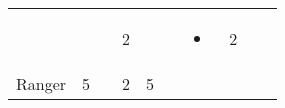 \documentclass[12pt]{article}
\begin{document}
\begin{longtable}[]{@{}llllllllll@{}}
\begin{minipage}[t]{0.06\columnwidth}\raggedright\strut
\strut\end{minipage} &
\begin{minipage}[t]{0.06\columnwidth}\raggedright\strut
\strut\end{minipage} &
\begin{minipage}[t]{0.06\columnwidth}\raggedright\strut
\strut\end{minipage} &
\begin{minipage}[t]{0.06\columnwidth}\raggedright\strut
2
\strut\end{minipage} &
\begin{minipage}[t]{0.06\columnwidth}\raggedright\strut
\strut\end{minipage} &
\begin{minipage}[t]{0.06\columnwidth}\raggedright\strut
\strut\end{minipage} &
\begin{minipage}[t]{0.07\columnwidth}\raggedright\strut
\begin{itemize}
\item
\end{itemize}
\strut\end{minipage} &
\begin{minipage}[t]{0.08\columnwidth}\raggedright\strut
2
\strut\end{minipage}\tabularnewline
\begin{minipage}[t]{0.13\columnwidth}\raggedright\strut
Ranger
\strut\end{minipage} &
\begin{minipage}[t]{0.06\columnwidth}\raggedright\strut
5
\strut\end{minipage} &
\begin{minipage}[t]{0.06\columnwidth}\raggedright\strut
\strut\end{minipage} &
\begin{minipage}[t]{0.06\columnwidth}\raggedright\strut
2
\strut\end{minipage} &
\begin{minipage}[t]{0.06\columnwidth}\raggedright\strut
5
\strut\end{minipage} &
\begin{minipage}[t]{0.06\columnwidth}\raggedright\strut
\strut\end{minipage} &
\begin{minipage}[t]{0.06\columnwidth}\raggedright\strut
\strut\end{minipage} &
\begin{minipage}[t]{0.06\columnwidth}\raggedright\strut

\end{minipage}
\end{longtable}
\end{document}
